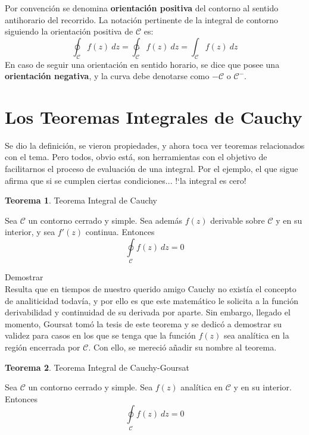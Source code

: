 \documentclass[12pt]{article}
\theoremstyle{definition}
\theoremstyle{theorem}
\newtheorem{theorem}{Teorema}[section]
\theoremstyle{corolary}
\begin{document}
Por convenci\'on se denomina \textbf{orientaci\'on positiva} del contorno al sentido antihorario del recorrido. La notaci\'on pertinente de la integral de contorno siguiendo la orientaci\'on positiva de $\mathcal{C}$ es: $$\oint_{\mathcal{C}}f(z)\ dz = \ointctrclockwise_{\mathcal{C}}f(z)\ dz = \int_{\mathcal{C}}f(z)\ dz$$
En caso de seguir una orientaci\'on en sentido horario, se dice que posee una \textbf{orientaci\'on negativa}, y la curva debe denotarse como $-\mathcal{C}$ o $\mathcal{C}^-$.

\section{Los Teoremas Integrales de Cauchy}
Se dio la definici\'on, se vieron propiedades, y ahora toca ver teoremas relacionados con el tema. Pero todos, obvio est\'a, son herramientas con el objetivo de facilitarnos el proceso de evaluaci\'on de una integral. Por el ejemplo, el que sigue afirma que si se cumplen ciertas condiciones... !`la integral es cero!\\

\colorbox{magenta!40!white!80}{\parbox{\linewidth}{
\theoremstyle{theorem}
\begin{theorem} {Teorema Integral de Cauchy}

Sea $\mathcal{C}$ un contorno cerrado y simple. Sea adem\'as $f(z)$ derivable sobre $\mathcal{C}$ y en su interior, y sea $f'(z)$ continua. Entonces $$\oint\limits_{\mathcal{C}}f(z)\ dz=0$$

\end{theorem}}}
\linebreak

Demostrar\\

Resulta que en tiempos de nuestro querido amigo Cauchy no exist\'ia el concepto de analiticidad todav\'ia, y por ello es que este matem\'atico le solicita a la funci\'on derivabilidad y continuidad de su derivada por aparte. Sin embargo, llegado el momento, Goursat tom\'o la tesis de este teorema y se dedic\'o a demostrar su validez para casos en los que se tenga que la funci\'on $f(z)$ sea anal\'itica en la regi\'on encerrada por $\mathcal{C}$. Con ello, se mereci\'o a\~nadir su nombre al teorema.\\

\colorbox{magenta!40!white!80}{\parbox{\linewidth}{
\theoremstyle{theorem}
\begin{theorem} {Teorema Integral de Cauchy-Goursat}

Sea $\mathcal{C}$ un contorno cerrado y simple. Sea $f(z)$ anal\'itica en $\mathcal{C}$ y en su interior. Entonces $$\oint\limits_{\mathcal{C}}f(z)\ dz=0$$

\end{theorem}}}
\linebreak
\linebreak
\end{document}
